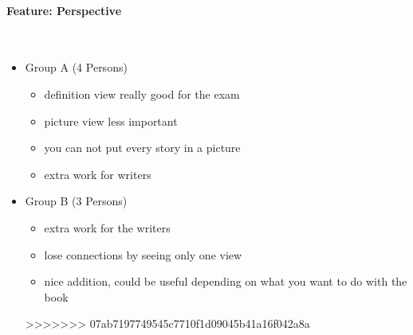 \documentclass[main.tex]{subfiles}
\begin{document}
\paragraph{Feature: Perspective}~
\begin{itemize}
	\item Group A (4 Persons)
		\begin{itemize}
			\item definition view really good for the exam
			\item picture view less important
			\item you can not put every story in a picture
			\item extra work for writers
		\end{itemize}
	\item Group B (3 Persons)
		\begin{itemize}
			\item extra work for the writers
			\item lose connections by seeing only one view
			\item nice addition, could be useful depending on what you want to do with the book
		\end{itemize}
>>>>>>> 07ab7197749545c7710f1d09045b41a16f042a8a
\end{itemize}
\end{document}

